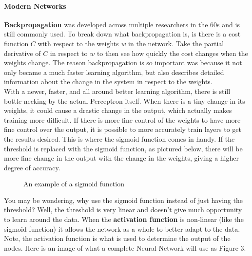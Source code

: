 \documentclass[12pt]{article}
\begin{document}
\paragraph{Modern Networks}
\textbf{Backpropagation} was developed across multiple researchers in the 60s and is still commonly used. To break down what backpropagation is, is there is a cost function $C$ with respect to the weights $w$ in the network. Take the partial derivative of $C$ in respect to $w$ to then see how quickly the cost changes when the weights change. The reason backpropagation is so important was because it not only became a much faster learning algorithm, but also describes detailed information about the change in the system in respect to the weights.  \\

With a newer, faster, and all around better learning algorithm, there is still bottle-necking by the actual Perceptron itself. When there is a tiny change in its weights, it could cause a drastic change in the output, which actually makes training more difficult. If there is more fine control of the weights to have more fine control over the output, it is possible to more accurately train layers to get the results desired. This is where the sigmoid function comes in handy. If the threshold is replaced with the sigmoid function, as pictured below, there will be more fine change in the output with the change in the weights, giving a higher degree of accuracy.

\begin{figure}[H]
    \centering
    \def\svgwidth{\columnwidth}
    
    \caption{An example of a sigmoid function}
\end{figure}

You may be wondering, why use the sigmoid function instead of just having the threshold? Well, the threshold is very linear and doesn't give much opportunity to learn around the data. When the \textbf{activation function} is non-linear (like the sigmoid function) it allows the network as a whole to better adapt to the data. Note, the activation function is what is used to determine the output of the nodes. Here is an image of what a complete Neural Network will use as Figure 3. \cite{nielsen_a._1970}
\end{document}
